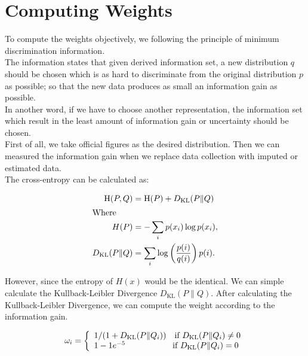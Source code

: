 \documentclass[nojss]{jss}\usepackage[]{graphicx}\usepackage[]{color}
\begin{document}
\section{Computing Weights}

To compute the weights objectively, we following the principle of
minimum discrimination information.\\

The information states that given derived information set, a new
distribution $q$ should be chosen which is as hard to discriminate
from the original distribution $p$ as possible; so that the new data
produces as small an information gain as possible.\\

In another word, if we have to choose another representation, the
information set which result in the least amount of information gain
or uncertainty should be chosen.\\

First of all, we take official figures as the desired
distribution. Then we can measured the information gain when we
replace data collection with imputed or estimated data.\\

The cross-entropy can be calculated as:

\begin{align*}
  \mathrm{H}(P, Q) &=  \mathrm{H}(P) + D_{\mathrm{KL}}(P \| Q)\\
  \intertext{Where}
  H(P) &= -\sum_{i} {p(x_i) \log p(x_i)},\\
  D_{\mathrm{KL}}(P\|Q) &= \sum_i \log\left(\frac{p(i)}{q(i)}\right) p(i).\\
\end{align*}



However, since the entropy of $H(x)$ would be the identical. We can
simple calculate the Kullback-Leibler Divergence
$D_{\mathrm{KL}}(P\|Q)$. After calculating the Kullback-Leibler
Divergence, we can compute the weight according to the information
gain.
  

\begin{equation*}
  \omega_i = \left\{
  \begin{array}{l r}
    1/(1 + D_{\mathrm{KL}}(P\|Q_i)) \quad \text{if $D_{\mathrm{KL}}(P\|Q_i) \ne 0$}\\
    1 - 1e^{-5} \, \, \, \, \quad \quad \quad \quad \quad \text{if $D_{\mathrm{KL}}(P\|Q_i) = 0$}
  \end{array} \right.
\end{equation*}
\end{document}
